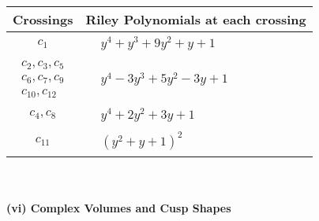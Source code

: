 \documentclass[1p]{elsarticle_modified}
\theoremstyle{definition}
\begin{document}
\begin{tabular}{m{50pt}|m{274pt}}
Crossings & \hspace{64pt}Riley Polynomials at each crossing \\
\hline $$\begin{aligned}c_{1}\end{aligned}$$&$\begin{aligned}
&y^4+y^3+9 y^2+y+1
\end{aligned}$\\
\hline $$\begin{aligned}c_{2},c_{3},c_{5}\\c_{6},c_{7},c_{9}\\c_{10},c_{12}\end{aligned}$$&$\begin{aligned}
&y^4-3 y^3+5 y^2-3 y+1
\end{aligned}$\\
\hline $$\begin{aligned}c_{4},c_{8}\end{aligned}$$&$\begin{aligned}
&y^4+2 y^2+3 y+1
\end{aligned}$\\
\hline $$\begin{aligned}c_{11}\end{aligned}$$&$\begin{aligned}
&(y^2+y+1)^2
\end{aligned}$\\
\hline
\end{tabular}\\~\\
\newpage\flushleft \textbf{(vi) Complex Volumes and Cusp Shapes}
\end{document}
